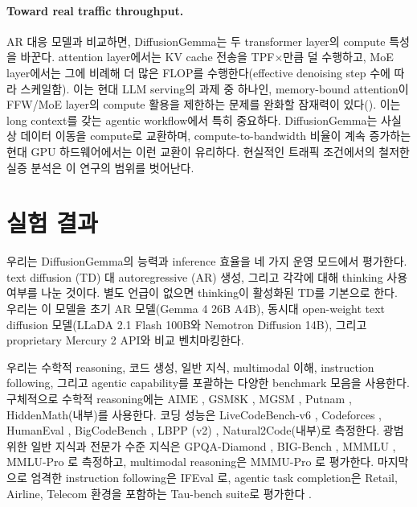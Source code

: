 \documentclass[11pt, a4paper, logo, copyright, gdm]{google}
\begin{document}
\paragraph{Toward real traffic throughput.} AR 대응 모델과 비교하면, DiffusionGemma는 두 transformer layer의 compute 특성을 바꾼다. attention layer에서는 KV cache 전송을 TPF$\times$만큼 덜 수행하고, MoE layer에서는 그에 비례해 더 많은 FLOP를 수행한다(effective denoising step 수에 따라 스케일함). 이는 현대 LLM serving의 과제 중 하나인, memory-bound attention이 FFW/MoE layer의 compute 활용을 제한하는 문제를 완화할 잠재력이 있다(\citealp{zhu2024nanoflow, tang2024quest, zhu2025megascaleinfer}). 이는 long context를 갖는 agentic workflow에서 특히 중요하다. DiffusionGemma는 사실상 데이터 이동을 compute로 교환하며, compute-to-bandwidth 비율이 계속 증가하는 현대 GPU 하드웨어에서는 이런 교환이 유리하다. 현실적인 트래픽 조건에서의 철저한 실증 분석은 이 연구의 범위를 벗어난다.

\section{실험 결과} \label{sec:experiments}

우리는 DiffusionGemma의 능력과 inference 효율을 네 가지 운영 모드에서 평가한다. text diffusion (TD) 대 autoregressive (AR) 생성, 그리고 각각에 대해 thinking 사용 여부를 나눈 것이다. 별도 언급이 없으면 thinking이 활성화된 TD를 기본으로 한다. 우리는 이 모델을 초기 AR 모델(Gemma 4 26B A4B), 동시대 open-weight text diffusion 모델(LLaDA 2.1 Flash 100B와 Nemotron Diffusion 14B), 그리고 proprietary Mercury 2 API와 비교 벤치마킹한다.

우리는 수학적 reasoning, 코드 생성, 일반 지식, multimodal 이해, instruction following, 그리고 agentic capability를 포괄하는 다양한 benchmark 모음을 사용한다. 구체적으로 수학적 reasoning에는 AIME \citep{dekoninck2026matharena}, GSM8K \citep{cobbe2021training}, MGSM \citep{shi2022language}, Putnam \citep{tsoukalas2024putnambench}, HiddenMath(내부)를 사용한다. 코딩 성능은 LiveCodeBench-v6 \citep{jain2025livecodebench}, Codeforces \citep{quan2025codeelo}, HumanEval \citep{chen2021evaluating}, BigCodeBench \citep{zhuo2025bigcodebench}, LBPP (v2) \citep{matton2024leakage}, Natural2Code(내부)로 측정한다. 광범위한 일반 지식과 전문가 수준 지식은 GPQA-Diamond \citep{rein2023gpqa}, BIG-Bench \citep{suzgun2022challenging}, MMMLU \citep{openai2024mmmlu}, MMLU-Pro \citep{wang2024mmlupro}로 측정하고, multimodal reasoning은 MMMU-Pro \citep{yue2025mmmu}로 평가한다. 마지막으로 엄격한 instruction following은 IFEval \citep{zhou2023instruction}로, agentic task completion은 Retail, Airline, Telecom 환경을 포함하는 Tau-bench suite로 평가한다 \citep{yao2024tau}.
\end{document}
